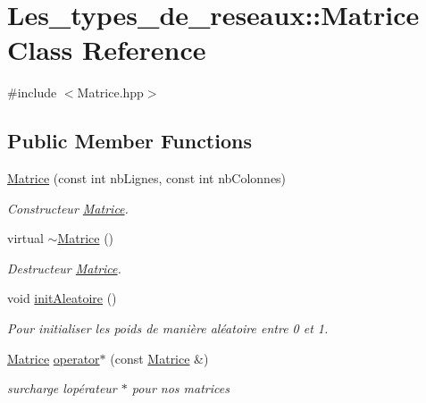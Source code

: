 \hypertarget{class_les__types__de__reseaux_1_1_matrice}{}\section{Les\+\_\+types\+\_\+de\+\_\+reseaux\+:\+:Matrice Class Reference}
\label{class_les__types__de__reseaux_1_1_matrice}


{\ttfamily \#include $<$Matrice.\+hpp$>$}

\subsection*{Public Member Functions}
\begin{DoxyCompactItemize}
\item 
\hyperlink{class_les__types__de__reseaux_1_1_matrice_a7a0b8038807072d949544f0dc2a9fcb2}{Matrice} (const int nb\+Lignes, const int nb\+Colonnes)
\begin{DoxyCompactList}\small\item\em Constructeur \hyperlink{class_les__types__de__reseaux_1_1_matrice}{Matrice}. \end{DoxyCompactList}\item 
virtual \hyperlink{class_les__types__de__reseaux_1_1_matrice_a2ff1d0b7e835d4b3c4b8f266083e67c6}{$\sim$\+Matrice} ()
\begin{DoxyCompactList}\small\item\em Destructeur \hyperlink{class_les__types__de__reseaux_1_1_matrice}{Matrice}. \end{DoxyCompactList}\item 
void \hyperlink{class_les__types__de__reseaux_1_1_matrice_ac8b34d8eed2d37979401bdfa7882c10e}{init\+Aleatoire} ()
\begin{DoxyCompactList}\small\item\em Pour initialiser les poids de manière aléatoire entre 0 et 1. \end{DoxyCompactList}\item 
\hyperlink{class_les__types__de__reseaux_1_1_matrice}{Matrice} \hyperlink{class_les__types__de__reseaux_1_1_matrice_a144c1b4b4ae020a7a54400f38c47e15a}{operator$\ast$} (const \hyperlink{class_les__types__de__reseaux_1_1_matrice}{Matrice} \&)
\begin{DoxyCompactList}\small\item\em surcharge l\textquotesingle{}opérateur $\ast$ pour nos matrices \end{DoxyCompactList}\end{DoxyCompactItemize}


